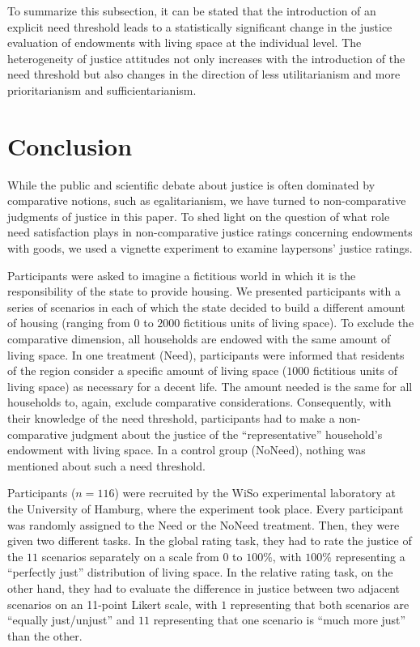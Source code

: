 \documentclass[12pt]{scrartcl}
\begin{document}
To summarize this subsection, it can be stated that the introduction of an explicit need threshold leads to a statistically significant change in the justice evaluation of endowments with living space at the individual level.
The heterogeneity of justice attitudes not only increases with the introduction of the need threshold but also changes in the direction of less utilitarianism and more prioritarianism and sufficientarianism.


\section{Conclusion}\label{sec:conclusion}
While the public and scientific debate about justice is often dominated by comparative notions, such as egalitarianism, we have turned to non-comparative judgments of justice in this paper.
To shed light on the question of what role need satisfaction plays in non-comparative justice ratings concerning endowments with goods, we used a vignette experiment to examine laypersons' justice ratings.

Participants were asked to imagine a fictitious world in which it is the responsibility of the state to provide housing.
We presented participants with a series of scenarios in each of which the state decided to build a different amount of housing (ranging from $0$ to $2000$ fictitious units of living space).
To exclude the comparative dimension, all households are endowed with the same amount of living space.
In one treatment (Need), participants were informed that residents of the region consider a specific amount of living space ($1000$ fictitious units of living space) as necessary for a decent life.
The amount needed is the same for all households to, again, exclude comparative considerations.
Consequently, with their knowledge of the need threshold, participants had to make a non-comparative judgment about the justice of the ``representative'' household's endowment with living space.
In a control group (NoNeed), nothing was mentioned about such a need threshold.

Participants ($n=116$) were recruited by the WiSo experimental laboratory at the University of Hamburg, where the experiment took place.
Every participant was randomly assigned to the Need or the NoNeed treatment.
Then, they were given two different tasks.
In the global rating task, they had to rate the justice of the $11$ scenarios separately on a scale from $0$ to $100\%$, with $100\%$ representing a ``perfectly just'' distribution of living space.
In the relative rating task, on the other hand, they had to evaluate the difference in justice between two adjacent scenarios on an 11-point Likert scale, with $1$ representing that both scenarios are ``equally just/unjust'' and $11$ representing that one scenario is ``much more just'' than the other.
\end{document}
